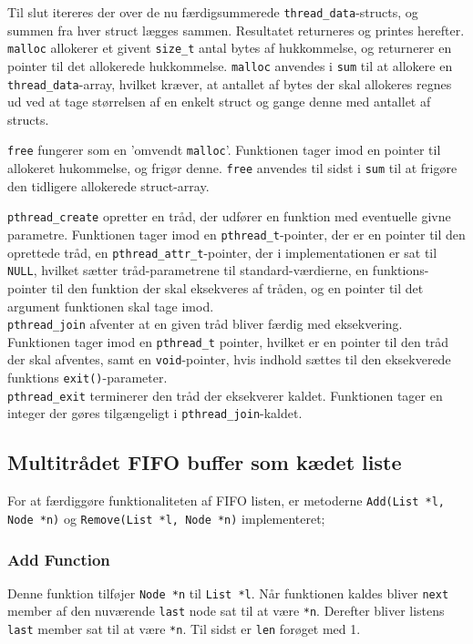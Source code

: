 Til slut itereres der over de nu færdigsummerede \texttt{thread\_data}-structs, og summen fra hver struct lægges sammen. Resultatet returneres og printes herefter. \\ 

\texttt{malloc} allokerer et givent \texttt{size\_t} antal bytes af hukkommelse, og returnerer en pointer til det allokerede hukkommelse. \texttt{malloc} anvendes i \texttt{sum} til at allokere en \texttt{thread\_data}-array, hvilket kræver, at antallet af bytes der skal allokeres regnes ud ved at tage størrelsen af en enkelt struct og gange denne med antallet af structs.

\texttt{free} fungerer som en 'omvendt \texttt{malloc}'. Funktionen tager imod en pointer til allokeret hukommelse, og frigør denne. \texttt{free} anvendes til sidst i \texttt{sum} til at frigøre den tidligere allokerede struct-array. 

\texttt{pthread\_create} opretter en tråd, der udfører en funktion med eventuelle givne parametre. 
Funktionen tager imod en \texttt{pthread\_t}-pointer, der er en pointer til den oprettede tråd, en \texttt{pthread\_attr\_t}-pointer, der i implementationen er sat til \texttt{NULL}, hvilket sætter tråd-parametrene til standard-værdierne, en funktions-pointer til den funktion der skal eksekveres af tråden, og en pointer til det argument funktionen skal tage imod. \\

\texttt{pthread\_join} afventer at en given tråd bliver færdig med eksekvering. 
Funktionen tager imod en \texttt{pthread\_t} pointer, hvilket er en pointer til den tråd der skal afventes, samt en \texttt{void}-pointer, hvis indhold sættes til den eksekverede funktions \texttt{exit()}-parameter.\\

\texttt{pthread\_exit} terminerer den tråd der eksekverer kaldet. Funktionen tager en integer der gøres tilgængeligt i \texttt{pthread\_join}-kaldet.

\subsection{Multitrådet FIFO buffer som kædet liste}
\label{list}
For at færdiggøre funktionaliteten af FIFO listen, er metoderne \texttt{Add(List *l, Node *n)} og \texttt{Remove(List *l, Node *n)} implementeret;

\subsubsection{Add Function}
Denne funktion tilføjer \texttt{Node *n} til \texttt{List *l}. Når funktionen kaldes bliver \texttt{next} member af den nuværende \texttt{last} node sat til at være \texttt{*n}. Derefter bliver listens \texttt{last} member sat til at være \texttt{*n}. Til sidst er \texttt{len} forøget med 1.

